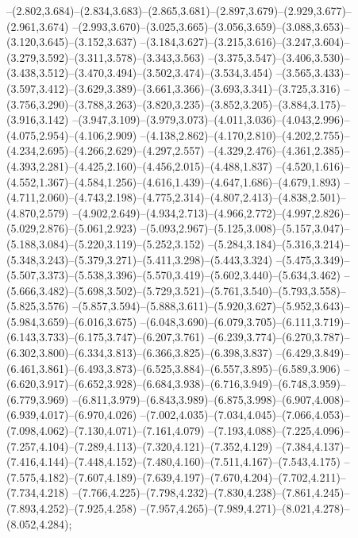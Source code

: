   --(2.802,3.684)--(2.834,3.683)--(2.865,3.681)--(2.897,3.679)--(2.929,3.677)--(2.961,3.674)%
  --(2.993,3.670)--(3.025,3.665)--(3.056,3.659)--(3.088,3.653)--(3.120,3.645)--(3.152,3.637)%
  --(3.184,3.627)--(3.215,3.616)--(3.247,3.604)--(3.279,3.592)--(3.311,3.578)--(3.343,3.563)%
  --(3.375,3.547)--(3.406,3.530)--(3.438,3.512)--(3.470,3.494)--(3.502,3.474)--(3.534,3.454)%
  --(3.565,3.433)--(3.597,3.412)--(3.629,3.389)--(3.661,3.366)--(3.693,3.341)--(3.725,3.316)%
  --(3.756,3.290)--(3.788,3.263)--(3.820,3.235)--(3.852,3.205)--(3.884,3.175)--(3.916,3.142)%
  --(3.947,3.109)--(3.979,3.073)--(4.011,3.036)--(4.043,2.996)--(4.075,2.954)--(4.106,2.909)%
  --(4.138,2.862)--(4.170,2.810)--(4.202,2.755)--(4.234,2.695)--(4.266,2.629)--(4.297,2.557)%
  --(4.329,2.476)--(4.361,2.385)--(4.393,2.281)--(4.425,2.160)--(4.456,2.015)--(4.488,1.837)%
  --(4.520,1.616)--(4.552,1.367)--(4.584,1.256)--(4.616,1.439)--(4.647,1.686)--(4.679,1.893)%
  --(4.711,2.060)--(4.743,2.198)--(4.775,2.314)--(4.807,2.413)--(4.838,2.501)--(4.870,2.579)%
  --(4.902,2.649)--(4.934,2.713)--(4.966,2.772)--(4.997,2.826)--(5.029,2.876)--(5.061,2.923)%
  --(5.093,2.967)--(5.125,3.008)--(5.157,3.047)--(5.188,3.084)--(5.220,3.119)--(5.252,3.152)%
  --(5.284,3.184)--(5.316,3.214)--(5.348,3.243)--(5.379,3.271)--(5.411,3.298)--(5.443,3.324)%
  --(5.475,3.349)--(5.507,3.373)--(5.538,3.396)--(5.570,3.419)--(5.602,3.440)--(5.634,3.462)%
  --(5.666,3.482)--(5.698,3.502)--(5.729,3.521)--(5.761,3.540)--(5.793,3.558)--(5.825,3.576)%
  --(5.857,3.594)--(5.888,3.611)--(5.920,3.627)--(5.952,3.643)--(5.984,3.659)--(6.016,3.675)%
  --(6.048,3.690)--(6.079,3.705)--(6.111,3.719)--(6.143,3.733)--(6.175,3.747)--(6.207,3.761)%
  --(6.239,3.774)--(6.270,3.787)--(6.302,3.800)--(6.334,3.813)--(6.366,3.825)--(6.398,3.837)%
  --(6.429,3.849)--(6.461,3.861)--(6.493,3.873)--(6.525,3.884)--(6.557,3.895)--(6.589,3.906)%
  --(6.620,3.917)--(6.652,3.928)--(6.684,3.938)--(6.716,3.949)--(6.748,3.959)--(6.779,3.969)%
  --(6.811,3.979)--(6.843,3.989)--(6.875,3.998)--(6.907,4.008)--(6.939,4.017)--(6.970,4.026)%
  --(7.002,4.035)--(7.034,4.045)--(7.066,4.053)--(7.098,4.062)--(7.130,4.071)--(7.161,4.079)%
  --(7.193,4.088)--(7.225,4.096)--(7.257,4.104)--(7.289,4.113)--(7.320,4.121)--(7.352,4.129)%
  --(7.384,4.137)--(7.416,4.144)--(7.448,4.152)--(7.480,4.160)--(7.511,4.167)--(7.543,4.175)%
  --(7.575,4.182)--(7.607,4.189)--(7.639,4.197)--(7.670,4.204)--(7.702,4.211)--(7.734,4.218)%
  --(7.766,4.225)--(7.798,4.232)--(7.830,4.238)--(7.861,4.245)--(7.893,4.252)--(7.925,4.258)%
  --(7.957,4.265)--(7.989,4.271)--(8.021,4.278)--(8.052,4.284);
